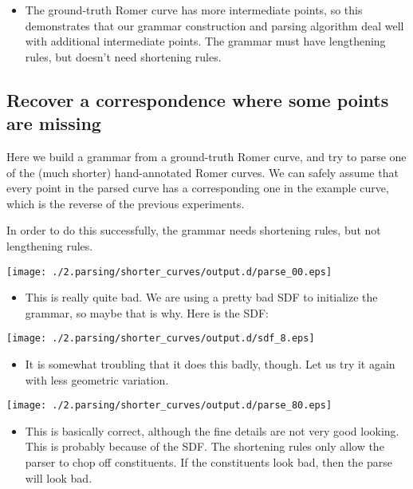 \documentclass{book}
\begin{document}
\begin{itemize}
\item The ground-truth Romer curve has more intermediate points, so this
    demonstrates that our grammar construction and parsing algorithm
    deal well with additional intermediate points. The grammar must
    have lengthening rules, but doesn't need shortening rules.
\end{itemize}
\subsection{Recover a correspondence where some points are missing}
\label{sec-3_3_3}

  Here we build a grammar from a ground-truth Romer curve, and try to
  parse one of the (much shorter) hand-annotated Romer curves. We can
  safely assume that every point in the parsed curve has a
  corresponding one in the example curve, which is the reverse of the
  previous experiments.

  In order to do this successfully, the grammar needs shortening
  rules, but not lengthening rules.

\texttt{[image: ./2.parsing/shorter\_curves/output.d/parse\_00.eps]}

\begin{itemize}
\item This is really quite bad. We are using a pretty bad SDF to
    initialize the grammar, so maybe that is why. Here is the SDF:
\end{itemize}

\texttt{[image: ./2.parsing/shorter\_curves/output.d/sdf\_8.eps]}

\begin{itemize}
\item It is somewhat troubling that it does this badly, though. Let us
    try it again with less geometric variation.
\end{itemize}

\texttt{[image: ./2.parsing/shorter\_curves/output.d/parse\_80.eps]}

\begin{itemize}
\item This is basically correct, although the fine details are not very
    good looking. This is probably because of the SDF. The shortening
    rules only allow the parser to chop off constituents. If the
    constituents look bad, then the parse will look bad.
\end{itemize}
\end{document}
